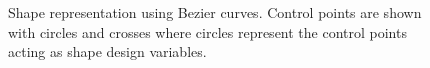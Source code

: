 \documentclass[12pt]{aiaa-pretty}
\begin{document}
\begin{figure}[H]
	\centering
	\quad
	\caption{Shape representation using Bezier curves. Control points are shown with circles and crosses where circles represent the control points acting as shape design variables.}
	\label{fig:airfoilParameterization}
\end{figure}
%
\end{document}
